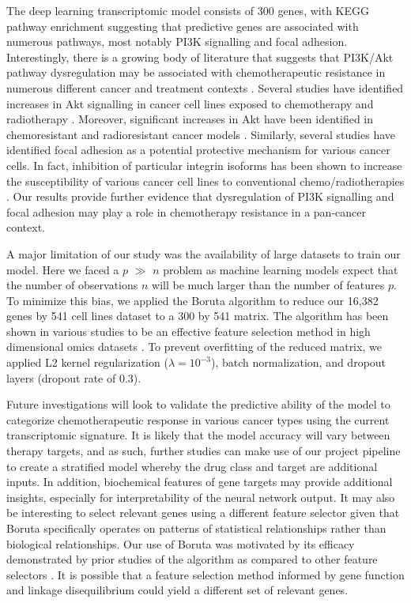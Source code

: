 \documentclass[10pt, letterpaper, twocolumn]{article}
\begin{document}
The deep learning transcriptomic model consists of 300 genes, with KEGG pathway enrichment suggesting that predictive genes are associated with numerous pathways, most notably PI3K signalling and focal adhesion. Interestingly, there is a growing body of literature that suggests that PI3K/Akt pathway dysregulation may be associated with chemotherapeutic resistance in numerous different cancer and treatment contexts \cite{huang_2009}. Several studies have identified increases in Akt signalling in cancer cell lines exposed to chemotherapy and radiotherapy \cite{mapk, wort, phos}. Moreover, significant increases in Akt have been identified in chemoresistant and radioresistant cancer models \cite{cholangio}. Similarly, several studies have identified focal adhesion as a potential protective mechanism for various cancer cells. In fact, inhibition of particular integrin isoforms has been shown to increase the susceptibility of various cancer cell lines to conventional chemo/radiotherapies \cite{focal_adhesion}. Our results provide further evidence that dysregulation of PI3K signalling and focal adhesion may play a role in chemotherapy resistance in a pan-cancer context.

A major limitation of our study was the availability of large datasets to train our model. Here we faced a $p$ $\gg$ $n$ problem as machine learning models expect that the number of observations $n$ will be much larger than the number of features $p$. To minimize this bias, we applied the Boruta algorithm to reduce our 16,382 genes by 541 cell lines dataset to a 300 by 541 matrix. The algorithm has been shown in various studies to be an effective feature selection method in high dimensional omics datasets \cite{boruta}. To prevent overfitting of the reduced matrix, we applied L2 kernel regularization ($\lambda=10^{-3}$), batch normalization, and dropout layers (dropout rate of 0.3).

Future investigations will look to validate the predictive ability of the model to categorize chemotherapeutic response in various cancer types using the current transcriptomic signature. It is likely that the model accuracy will vary between therapy targets, and as such, further studies can make use of our project pipeline to create a stratified model whereby the drug class and target are additional inputs. In addition, biochemical features of gene targets may provide additional insights, especially for interpretability of the neural network output. It may also be interesting to select relevant genes using a different feature selector given that Boruta specifically operates on patterns of statistical relationships rather than biological relationships. Our use of Boruta was motivated by its efficacy demonstrated by prior studies of the algorithm as compared to other feature selectors \cite{boruta, deep_cell}. It is possible that a feature selection method informed by gene function and linkage disequilibrium could yield a different set of relevant genes.
\end{document}
